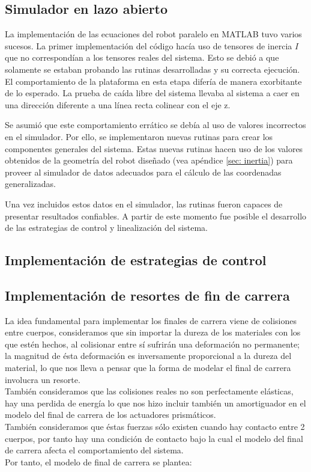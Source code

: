 \subsection{Simulador en lazo abierto}
La implementación de las ecuaciones del robot paralelo en 
MATLAB tuvo varios sucesos.
La primer implementación del código hacía uso de tensores de 
inercia $I$ que no correspondían a los tensores reales del sistema.
Esto se debió a que solamente se estaban probando las
rutinas desarrolladas y su correcta ejecución.
El comportamiento de la plataforma en esta etapa difería 
de manera exorbitante de lo esperado.
La prueba de caída libre del sistema llevaba al sistema a caer en 
una dirección diferente a una línea recta colinear con el eje z.

Se asumió que este comportamiento errático se debía al uso de 
valores incorrectos en el simulador.
Por ello, se implementaron nuevas rutinas para 
crear los componentes generales del sistema.
Estas nuevas rutinas hacen uso de los valores obtenidos de la
geometría del robot diseñado (vea apéndice \ref{sec: inertia})
para proveer al simulador de datos adecuados para
el cálculo de las coordenadas generalizadas.

Una vez incluidos estos datos en el simulador, 
las rutinas fueron capaces de 
presentar resultados confiables.
A partir de este momento fue posible el desarrollo
de las estrategias de control y 
linealización del sistema.

\subsection{Implementación de estrategias de control}




\subsection{Implementación de resortes de fin de carrera}
La idea fundamental para implementar los finales de carrera viene de colisiones entre cuerpos, consideramos que sin importar la dureza de los materiales con los que estén hechos, al colisionar entre sí sufrirán una deformación no permanente; la magnitud de ésta deformación es inversamente proporcional a la dureza del material, lo que nos lleva a pensar que la forma de modelar el final de carrera involucra un resorte.\\
También consideramos que las colisiones reales no son perfectamente elásticas, hay una perdida de energía lo que nos hizo incluir también un amortiguador en el modelo del final de carrera de los actuadores prismáticos.\\
También consideramos que éstas fuerzas sólo existen cuando hay contacto entre 2 cuerpos, por tanto hay una condición de contacto bajo la cual el modelo del final de carrera afecta el comportamiento del sistema.\\
 Por tanto, el modelo de final de carrera se plantea:
 
